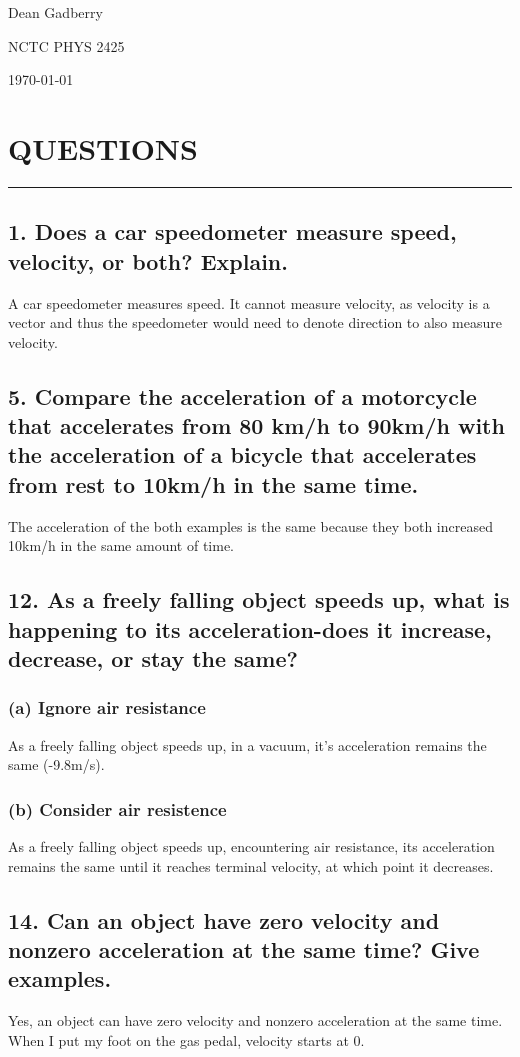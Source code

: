 \documentclass[12pt,a4paper,english]{article}
\begin{document}
\begin{flushleft}
    Dean Gadberry

    NCTC PHYS 2425

    \today

    \section*{QUESTIONS}
      \hrule
      \subsection{1. Does a car speedometer measure speed, velocity, or both? Explain.}
        A car speedometer measures speed. It cannot measure velocity, as velocity is a vector and thus the speedometer would need to denote direction to also measure velocity.
      \subsection{5. Compare the acceleration of a motorcycle that accelerates from 80 km/h to 90km/h with the acceleration of a bicycle that accelerates from rest to 10km/h in the same time.}
        The acceleration of the both examples is the same because they both increased 10km/h in the same amount of time.
      \subsection{12. As a freely falling object speeds up, what is happening to its acceleration-does it increase, decrease, or stay the same?}
        \subsubsection{(a) Ignore air resistance}
        As a freely falling object speeds up, in a vacuum, it's acceleration remains the same (-9.8m/s).
        \subsubsection{(b) Consider air resistence}
        As a freely falling object speeds up, encountering air resistance, its acceleration remains the same until it reaches terminal velocity, at which point it decreases.
      \subsection{14. Can an object have zero velocity and nonzero acceleration at the same time? Give examples.}
      Yes, an object can have zero velocity and nonzero acceleration at the same time. When I put my foot on the gas pedal, velocity starts at 0.

\end{flushleft}
\end{document}
